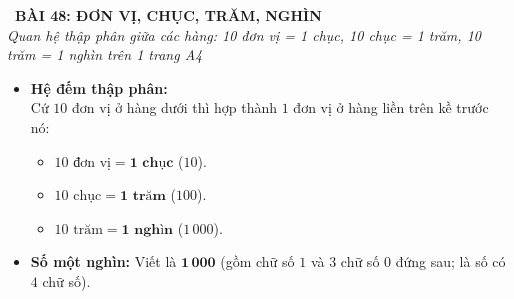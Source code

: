 \documentclass[11pt,a4paper]{article}
\begin{document}
\begin{tcolorbox}[
  enhanced,
  colback=violet!8!white,
  colframe=violet!70!black,
  arc=3mm, boxrule=1.2pt,
  left=3mm, right=3mm, top=2mm, bottom=2mm,
  halign=center
]
  {\LARGE\bfseries\color{violet!90!black}\faBookmark\ BÀI 48: ĐƠN VỊ, CHỤC, TRĂM, NGHÌN}\\[1mm]
  {\itshape\footnotesize\color{black!75} Quan hệ thập phân giữa các hàng: 10 đơn vị = 1 chục, 10 chục = 1 trăm, 10 trăm = 1 nghìn trên 1 trang A4}
\end{tcolorbox}

\vspace{-2mm}

\noindent
\begin{minipage}[t]{0.49\textwidth}\vspace{0pt}
\begin{tcolorbox}[
  enhanced,
  colback=violet!4!white,
  colframe=violet!75!black,
  arc=2mm, boxrule=0.8pt,
  left=2mm, right=2mm, top=1.8mm, bottom=1.8mm,
  title={\footnotesize\bfseries\color{white}\faKey\ 1. Mối quan hệ giữa các hàng}
]
{\footnotesize
\begin{itemize}\setlength{\itemsep}{1pt}\setlength{\leftskip}{-2.5mm}
  \item \textbf{Hệ đếm thập phân:}\\
  Cứ $10$ đơn vị ở hàng dưới thì hợp thành $1$ đơn vị ở hàng liền trên kề trước nó:
  \begin{itemize}\setlength{\itemsep}{0.5pt}\setlength{\leftskip}{-2.5mm}
    \item $10\text{ đơn vị} = \mathbf{1\text{ chục}}$ ($10$).
    \item $10\text{ chục} = \mathbf{1\text{ trăm}}$ ($100$).
    \item $10\text{ trăm} = \mathbf{1\text{ nghìn}}$ ($1\,000$).
  \end{itemize}
  \item \textbf{Số một nghìn:} Viết là $\mathbf{1\,000}$ (gồm chữ số $1$ và $3$ chữ số $0$ đứng sau; là số có $4$ chữ số).
\end{itemize}
}
\end{tcolorbox}
\end{minipage}
\hfill
\end{document}

